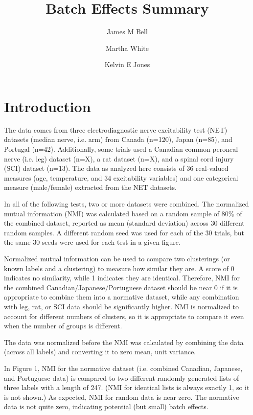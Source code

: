 \documentclass[12pt]{article}
\title{Batch Effects Summary}
\author[1,2]{James M Bell}
\author[2]{Martha White}
\author[1,3]{Kelvin E Jones}
\affil[1]{Neuroscience and Mental Health Institute, University of Alberta}
\affil[2]{Department of Computing Science, University of Alberta}
\affil[2]{Department of Kinesiology, Sport, and Recreation, University of Alberta}
\begin{document}
\maketitle

\section{Introduction}

The data comes from three electrodiagnostic nerve excitability test (NET) datasets (median nerve, i.e. arm) from Canada (n=120), Japan (n=85), and Portugal (n=42). Additionally, some trials used a Canadian common peroneal nerve (i.e. leg) dataset (n=X), a rat dataset (n=X), and a spinal cord injury (SCI) dataset (n=13). The data as analyzed here consists of 36 real-valued measures (age, temperature, and 34 excitability variables) and one categorical measure (male/female) extracted from the NET datasets.


In all of the following tests, two or more datasets were combined. The normalized mutual information (NMI) was calculated based on a random sample of 80\% of the combined dataset, reported as mean (standard deviation) across 30 different random samples. A different random seed was used for each of the 30 trials, but the same 30 seeds were used for each test in a given figure.

Normalized mutual information can be used to compare two clusterings (or known labels and a clustering) to measure how similar they are. A score of 0 indicates no similarity, while 1 indicates they are identical. Therefore, NMI for the combined Canadian/Japanese/Portuguese dataset should be near 0 if it is appropriate to combine them into a normative dataset, while any combination with leg, rat, or SCI data should be significantly higher. NMI is normalized to account for different numbers of clusters, so it is appropriate to compare it even when the number of groups is different.

The data was normalized before the NMI was calculated by combining the data (across all labels) and converting it to zero mean, unit variance.

In Figure 1, NMI for the normative dataset (i.e. combined Canadian, Japanese, and Portuguese data) is compared to two different randomly generated lists of three labels with a length of 247. (NMI for identical lists is always exactly 1, so it is not shown.) As expected, NMI for random data is near zero. The normative data is not quite zero, indicating potential (but small) batch effects.
\end{document}
